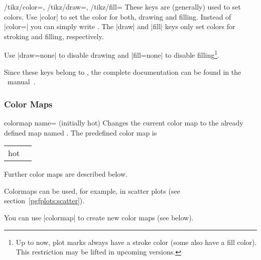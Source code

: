 \begin{keylist}{
	/tikz/color=,
	/tikz/draw=,
	/tikz/fill=}
	These keys are (generally) used to set colors. Use |color| to set the color for both, drawing and filling. Instead of |color=| you can simply write . The |draw| and |fill| keys only set colors for stroking and filling, respectively.

	Use |draw=none| to disable drawing and |fill=none| to disable filling\footnote{Up to now, plot marks always have a stroke color (some also have a fill color). This restriction may be lifted in upcoming versions.}.%

	Since these keys belong to \Tikz, the complete documentation can be found in the \Tikz\ manual~\cite[Section ``Specifying a Color'']{tikz}.
\end{keylist}

\subsubsection{Color Maps}
\label{pgfplots:colormap}
\begin{pgfplotskey}{colormap name= (initially hot)}
	Changes the current color map to the already defined map named . The predefined color map is

	\begin{tabular}{>{\ttfamily}ll}
	hot & \pgfplotsshowcolormap{hot}\\
	\end{tabular}

	Further color maps are described below.

	Colormaps can be used, for example, in scatter plots (see section~\ref{pgfplots:scatter}).

	You can use |colormap| to create new color maps (see below).
\end{pgfplotskey}

